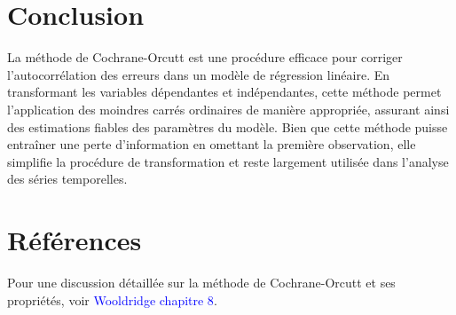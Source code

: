 \documentclass[14pt]{extarticle} %
\theoremstyle{definition}
\theoremstyle{plain}
\begin{document}
\section{Conclusion}
La méthode de Cochrane-Orcutt est une procédure efficace pour corriger l'autocorrélation des erreurs dans un modèle de régression linéaire. En transformant les variables dépendantes et indépendantes, cette méthode permet l'application des moindres carrés ordinaires de manière appropriée, assurant ainsi des estimations fiables des paramètres du modèle. Bien que cette méthode puisse entraîner une perte d'information en omettant la première observation, elle simplifie la procédure de transformation et reste largement utilisée dans l'analyse des séries temporelles.

\section{Références}
Pour une discussion détaillée sur la méthode de Cochrane-Orcutt et ses propriétés, voir \textcolor{blue}{Wooldridge chapitre 8}.
\end{document}
